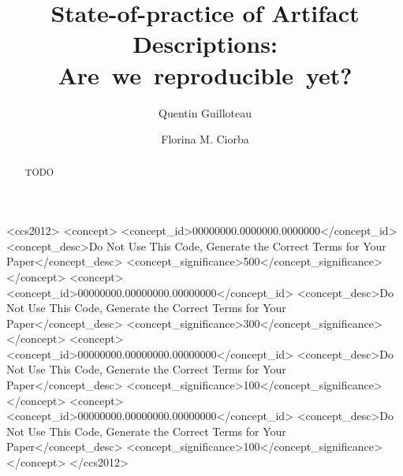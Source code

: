 \documentclass[sigconf,natbib=false]{acmart}
\newcommand{\ad}{Artifact Description}
\begin{document}
\title{State-of-practice of \ad s: Are~we~reproducible~yet?}

\author{Quentin Guilloteau}\author{Florina M. Ciorba}


\begin{abstract}
TODO
\end{abstract}

\begin{CCSXML}
<ccs2012>
 <concept>
  <concept_id>00000000.0000000.0000000</concept_id>
  <concept_desc>Do Not Use This Code, Generate the Correct Terms for Your Paper</concept_desc>
  <concept_significance>500</concept_significance>
 </concept>
 <concept>
  <concept_id>00000000.00000000.00000000</concept_id>
  <concept_desc>Do Not Use This Code, Generate the Correct Terms for Your Paper</concept_desc>
  <concept_significance>300</concept_significance>
 </concept>
 <concept>
  <concept_id>00000000.00000000.00000000</concept_id>
  <concept_desc>Do Not Use This Code, Generate the Correct Terms for Your Paper</concept_desc>
  <concept_significance>100</concept_significance>
 </concept>
 <concept>
  <concept_id>00000000.00000000.00000000</concept_id>
  <concept_desc>Do Not Use This Code, Generate the Correct Terms for Your Paper</concept_desc>
  <concept_significance>100</concept_significance>
 </concept>
</ccs2012>
\end{CCSXML}




\maketitle
\end{document}
